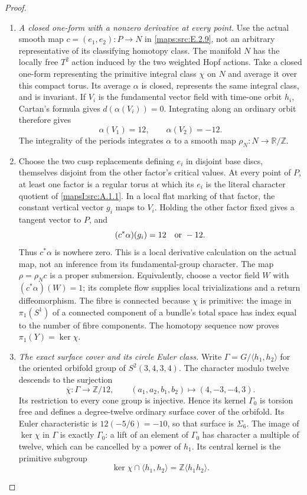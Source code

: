 \begin{proof}
\begin{enumerate}[label=\arabic*.,leftmargin=*]
\item \emph{A closed one-form with a nonzero derivative at every point.}
Use the actual smooth map $c=(e_1,e_2):P\to N$ in \ref{maps:src:E.2.9},
not an arbitrary representative of its classifying homotopy
class. The manifold $N$ has the locally free $T^2$ action
induced by the two weighted Hopf actions. Take a closed
one-form representing the primitive integral class $\chi$
on $N$ and average it over this compact torus. Its average
$\alpha$ is closed, represents the same integral class,
and is invariant. If $V_i$ is the fundamental vector field
with time-one orbit $h_i$, Cartan's formula gives
$d(\alpha(V_i))=0$. Integrating along an ordinary orbit
therefore gives
\[
                  \alpha(V_1)=12,\qquad \alpha(V_2)=-12.
 \tag{E.S25}\label{maps:eq:E.S25}
\]
The integrality of the periods integrates $\alpha$ to a
smooth map $\rho_N:N\to\mathbb R/\mathbb Z$.

\item Choose the two cusp replacements defining $e_i$ in disjoint
base discs, themselves disjoint from the other factor's
critical values. At every point of $P$, at least one factor
is a regular torus at which its $e_i$ is the literal character
quotient of \cref{mapsI:src:A.1.1}. In a local flat marking of that factor,
the constant vertical vector $g_i$ maps to $V_i$. Holding
the other factor fixed gives a tangent vector to $P$, and
\[
                     (c^*\alpha)(g_i)=12\quad\hbox{or }-12.
\]
Thus $c^*\alpha$ is nowhere zero. This is a local derivative
calculation on the actual map, not an inference from its
fundamental-group character. The map $\rho=\rho_Nc$ is a
proper submersion. Equivalently, choose a vector field $W$
with $(c^*\alpha)(W)=1$; its complete flow supplies local
trivializations and a return diffeomorphism. The fibre is
connected because $\chi$ is primitive: the image in
$\pi_1(S^1)$ of a connected component of a bundle's total
space has index equal to the number of fibre components.
The homotopy sequence now proves $\pi_1(Y)=\ker\chi$.

\item \emph{The exact surface cover and its circle Euler class.}
Write $\Gamma=G/\langle h_1,h_2\rangle$ for the oriented
orbifold group of $S^2(3,4,3,4)$. The character modulo
twelve descends to the surjection
\[
 \overline\chi:\Gamma\longrightarrow\mathbb Z/12,
       \qquad(a_1,a_2,b_1,b_2)\longmapsto(4,-3,-4,3).
 \tag{E.S26}\label{maps:eq:E.S26}
\]
Its restriction to every cone group is injective. Hence its
kernel $\Gamma_0$ is torsion free and defines a degree-twelve
ordinary surface cover of the orbifold. Its Euler characteristic
is $12(-5/6)=-10$, so that surface is $\Sigma_6$. The image
of $\ker\chi$ in $\Gamma$ is exactly $\Gamma_0$: a lift of
an element of $\Gamma_0$ has character a multiple of twelve,
which can be cancelled by a power of $h_1$. Its central
kernel is the primitive subgroup
\[
 \ker\chi\cap\langle h_1,h_2\rangle
                =\mathbb Z\langle h_1h_2\rangle.
 \tag{E.S27}\label{maps:eq:E.S27}
\]


\end{enumerate}
\end{proof}
